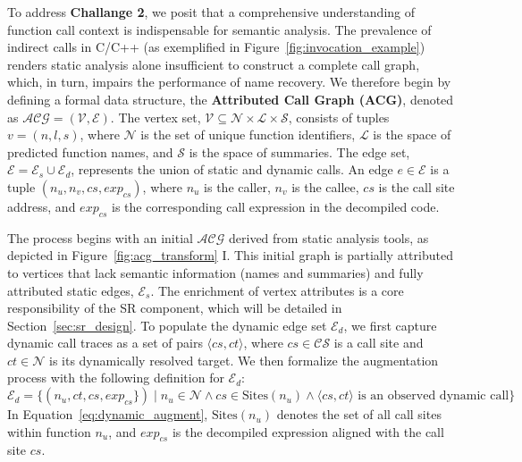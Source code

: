 \documentclass[acmsmall,screen,review,anonymous]{acmart} %
\begin{document}
To address \textbf{Challange 2}, we posit that a comprehensive understanding of function call context is indispensable for semantic analysis. The prevalence of indirect calls in C/C++ (as exemplified in Figure~\ref{fig:invocation_example}) renders static analysis alone insufficient to construct a complete call graph, which, in turn, impairs the performance of name recovery. We therefore begin by defining a formal data structure, the \textbf{Attributed Call Graph (ACG)}, denoted as \( \mathcal{ACG} = (\mathcal{V}, \mathcal{E}) \). The vertex set, \(\mathcal{V} \subseteq \mathcal{N} \times \mathcal{L} \times \mathcal{S}\), consists of tuples \(v = (n, l, s)\), where \(\mathcal{N}\) is the set of unique function identifiers, \(\mathcal{L}\) is the space of predicted function names, and \(\mathcal{S}\) is the space of summaries. The edge set, \(\mathcal{E} = \mathcal{E}_{s} \cup \mathcal{E}_{d}\), represents the union of static and dynamic calls. An edge \(e \in \mathcal{E}\) is a tuple \((n_u, n_v, cs, exp_{cs})\), where \(n_u\) is the caller, \(n_v\) is the callee, \(cs\) is the call site address, and \(exp_{cs}\) is the corresponding call expression in the decompiled code.

The process begins with an initial $\mathcal{ACG}$ derived from static analysis tools, as depicted in Figure~\ref{fig:acg_transform} \normalsize{\textcircled{\scriptsize{I}}}\normalsize. This initial graph is partially attributed to vertices that lack semantic information (names and summaries) and fully attributed static edges, \(\mathcal{E}_s\). The enrichment of vertex attributes is a core responsibility of the SR component, which will be detailed in Section~\ref{sec:sr_design}. To populate the dynamic edge set \(\mathcal{E}_d\), we first capture dynamic call traces as a set of pairs $\langle cs, ct \rangle$, where \(cs \in \mathcal{CS}\) is a call site and \(ct \in \mathcal{N}\) is its dynamically resolved target. We then formalize the augmentation process with the following definition for \(\mathcal{E}_d\):
\begin{equation}
\label{eq:dynamic_augment}
\mathcal{E}_d = \{ (n_u, ct, cs, exp_{cs}\}) \mid n_u \in \mathcal{N} \land cs \in \text{Sites}(n_u) \land \langle cs, ct \rangle \text{ is an observed dynamic call} \}
\end{equation}
In Equation~\ref{eq:dynamic_augment}, \(\text{Sites}(n_u)\) denotes the set of all call sites within function \(n_u\), and \(exp_{cs}\) is the decompiled expression aligned with the call site \(cs\).
\end{document}
